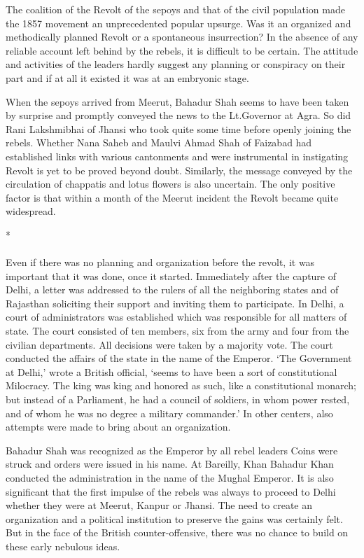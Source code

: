 The coalition of the Revolt of the sepoys and that of the civil population made the 1857 movement an unprecedented popular upsurge. Was it an organized and methodically planned Revolt or a spontaneous insurrection? In the absence of any reliable account left behind by the rebels, it is difficult to be certain. The attitude and activities of the leaders hardly suggest any planning or conspiracy on their part and if at all it existed it was at an embryonic stage.

When the sepoys arrived from Meerut, Bahadur Shah seems to have been taken by surprise and promptly conveyed the news to the Lt.Governor at Agra. So did Rani Lakshmibhai of Jhansi who took quite some time before openly joining the rebels. Whether Nana Saheb and Maulvi Ahmad Shah of Faizabad had established links with various cantonments and were instrumental in instigating Revolt is yet to be proved beyond doubt. Similarly, the message conveyed by the circulation of chappatis and lotus flowers is also uncertain. The only positive factor is that within a month of the Meerut incident the Revolt became quite widespread.

\begin{center}*\end{center}

\paragraph*{}
Even if there was no planning and organization before the revolt, it was important that it was done, once it started. Immediately after the capture of Delhi, a letter was addressed to the rulers of all the neighboring states and of Rajasthan soliciting their support and inviting them to participate. In Delhi, a court of administrators was established which was responsible for all matters of state. The court consisted of ten members, six from the army and four from the civilian departments. All decisions were taken by a majority vote. The court conducted the affairs of the state in the name of the Emperor. `The Government at Delhi,' wrote a British official, `seems to have been a sort of constitutional Milocracy. The king was king and honored as such, like a constitutional monarch; but instead of a Parliament, he had a council of soldiers, in whom power rested, and of whom he was no degree a military commander.' In other centers, also attempts were made to bring about an organization.

Bahadur Shah was recognized as the Emperor by all rebel leaders Coins were struck and orders were issued in his name. At Bareilly, Khan Bahadur Khan conducted the administration in the name of the Mughal Emperor. It is also significant that the first impulse of the rebels was always to proceed to Delhi whether they were at Meerut, Kanpur or Jhansi. The need to create an organization and a political institution to preserve the gains was certainly felt. But in the face of the British counter-offensive, there was no chance to build on these early nebulous ideas.

